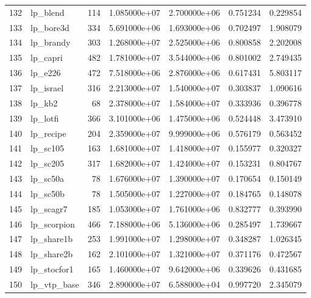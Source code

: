\begin{tabular}{llrrrrr}
132 &                 lp\_blend &   114 &  1.085000e+07 &  2.700000e+06 &  0.751234 &   0.229854 \\
133 &                lp\_bore3d &   334 &  5.691000e+06 &  1.693000e+06 &  0.702497 &   1.908079 \\
134 &                lp\_brandy &   303 &  1.268000e+07 &  2.525000e+06 &  0.800858 &   2.202008 \\
135 &                 lp\_capri &   482 &  1.781000e+07 &  3.544000e+06 &  0.801002 &   2.749435 \\
136 &                  lp\_e226 &   472 &  7.518000e+06 &  2.876000e+06 &  0.617431 &   5.803117 \\
137 &                lp\_israel &   316 &  2.213000e+07 &  1.540000e+07 &  0.303837 &   1.090616 \\
138 &                   lp\_kb2 &    68 &  2.378000e+07 &  1.584000e+07 &  0.333936 &   0.396778 \\
139 &                 lp\_lotfi &   366 &  3.101000e+06 &  1.475000e+06 &  0.524448 &   3.473910 \\
140 &                lp\_recipe &   204 &  2.359000e+07 &  9.999000e+06 &  0.576179 &   0.563452 \\
141 &                 lp\_sc105 &   163 &  1.681000e+07 &  1.418000e+07 &  0.155977 &   0.320327 \\
142 &                 lp\_sc205 &   317 &  1.682000e+07 &  1.424000e+07 &  0.153231 &   0.804767 \\
143 &                 lp\_sc50a &    78 &  1.676000e+07 &  1.390000e+07 &  0.170654 &   0.150149 \\
144 &                 lp\_sc50b &    78 &  1.505000e+07 &  1.227000e+07 &  0.184765 &   0.148078 \\
145 &                lp\_scagr7 &   185 &  1.053000e+07 &  1.761000e+06 &  0.832777 &   0.393990 \\
146 &              lp\_scorpion &   466 &  7.188000e+06 &  5.136000e+06 &  0.285497 &   1.739667 \\
147 &               lp\_share1b &   253 &  1.991000e+07 &  1.298000e+07 &  0.348287 &   1.026345 \\
148 &               lp\_share2b &   162 &  2.101000e+07 &  1.321000e+07 &  0.371176 &   0.472567 \\
149 &              lp\_stocfor1 &   165 &  1.460000e+07 &  9.642000e+06 &  0.339626 &   0.431685 \\
150 &              lp\_vtp\_base &   346 &  2.890000e+07 &  6.588000e+04 &  0.997720 &   2.345079 \\

\end{tabular}
